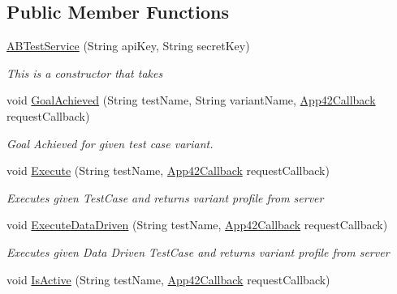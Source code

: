 \subsection*{Public Member Functions}
\begin{DoxyCompactItemize}
\item 
\hyperlink{classcom_1_1shephertz_1_1app42_1_1paas_1_1sdk_1_1windows_1_1abtest_1_1_a_b_test_service_a8a3327a026adf7dedeab0e92c86d292c}{A\+B\+Test\+Service} (String api\+Key, String secret\+Key)
\begin{DoxyCompactList}\small\item\em This is a constructor that takes \end{DoxyCompactList}\item 
void \hyperlink{classcom_1_1shephertz_1_1app42_1_1paas_1_1sdk_1_1windows_1_1abtest_1_1_a_b_test_service_ac62e296e15458b8bfcb99df5f3b0a99c}{Goal\+Achieved} (String test\+Name, String variant\+Name, \hyperlink{interfacecom_1_1shephertz_1_1app42_1_1paas_1_1sdk_1_1windows_1_1_app42_callback}{App42\+Callback} request\+Callback)
\begin{DoxyCompactList}\small\item\em Goal Achieved for given test case variant. \end{DoxyCompactList}\item 
void \hyperlink{classcom_1_1shephertz_1_1app42_1_1paas_1_1sdk_1_1windows_1_1abtest_1_1_a_b_test_service_a0aeadd62b820070f061bc9860a6ce9c5}{Execute} (String test\+Name, \hyperlink{interfacecom_1_1shephertz_1_1app42_1_1paas_1_1sdk_1_1windows_1_1_app42_callback}{App42\+Callback} request\+Callback)
\begin{DoxyCompactList}\small\item\em Executes given Test\+Case and returns variant profile from server \end{DoxyCompactList}\item 
void \hyperlink{classcom_1_1shephertz_1_1app42_1_1paas_1_1sdk_1_1windows_1_1abtest_1_1_a_b_test_service_a502af7fc22c3bb88e2027f9c80a1b390}{Execute\+Data\+Driven} (String test\+Name, \hyperlink{interfacecom_1_1shephertz_1_1app42_1_1paas_1_1sdk_1_1windows_1_1_app42_callback}{App42\+Callback} request\+Callback)
\begin{DoxyCompactList}\small\item\em Executes given Data Driven Test\+Case and returns variant profile from server \end{DoxyCompactList}\item 
void \hyperlink{classcom_1_1shephertz_1_1app42_1_1paas_1_1sdk_1_1windows_1_1abtest_1_1_a_b_test_service_a0a1d1b6ab77c68211af1896db8ace6d4}{Is\+Active} (String test\+Name, \hyperlink{interfacecom_1_1shephertz_1_1app42_1_1paas_1_1sdk_1_1windows_1_1_app42_callback}{App42\+Callback} request\+Callback)

\end{DoxyCompactItemize}
